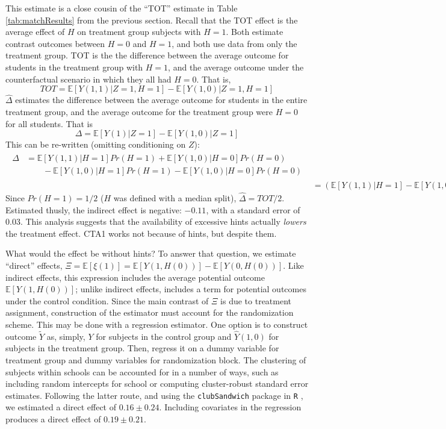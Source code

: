 \documentclass{article}
\newcommand{\EE}{\mathbb{E}}
\begin{document}
This estimate is a close cousin of the ``TOT'' estimate in Table
\ref{tab:matchResults} from the previous section.
Recall that the TOT effect is the average effect of $H$ on treatment
group subjects with $H=1$.
Both estimate contrast outcomes between $H=0$ and $H=1$, and both use
data from only the treatment group.
TOT is the the difference between the average outcome for students in
the treatment group with $H=1$, and the average outcome under the
counterfactual scenario in which they all had $H=0$.
That is,
\begin{equation*}
TOT=\EE[Y(1,1)|Z=1,H=1]-\EE[Y(1,0)|Z=1,H=1]
\end{equation*}
$\hat{\Delta}$ estimates the difference between the average outcome
for students in the entire treatment group, and the average outcome
for the treatment group were $H=0$ for all students.
That is
\begin{equation*}
\Delta=\EE[Y(1)|Z=1]-\EE[Y(1,0)|Z=1]
\end{equation*}
This can be re-written (omitting conditioning on $Z$):
\begin{align*}
\begin{split}
\Delta&=\EE[Y(1,1)|H=1]Pr(H=1)+\EE[Y(1,0)|H=0]Pr(H=0)\\
&\qquad -\EE[Y(1,0)|H=1]Pr(H=1)-\EE[Y(1,0)|H=0]Pr(H=0)
\end{split}
\\[2ex]
&=(\EE[Y(1,1)|H=1]-\EE[Y(1,0)|H=1])Pr(H=1)
\end{align*}
Since $Pr(H=1)=1/2$ ($H$ was defined with a median split),
$\hat{\Delta}=TOT/2$.
Estimated thusly, the indirect effect is negative: $-0.11$, with
a standard error of 0.03.
This analysis suggests that the availability of excessive hints
actually \emph{lowers} the treatment effect.
CTA1 works not because of hints, but despite them.

What would the effect be without hints?
To answer that question, we estimate ``direct'' effects,
$\Xi=\EE[\xi(1)]=\EE[Y(1,H(0))]-\EE[Y(0,H(0))]$.
Like indirect effects, this expression includes the average potential
outcome $\EE[Y(1,H(0))]$; unlike indirect effects, includes a term for
potential outcomes under the control condition.
Since the main contrast of $\Xi$ is due to treatment assignment,
construction of the estimator must account for the randomization
scheme.
This may be done with a regression estimator.
One option is to construct outcome $\tilde{Y}$ as, simply, $Y$ for
subjects in the control group and $\hat{Y}(1,0)$ for subjects in the
treatment group.
Then, regress it on a dummy variable for treatment group and dummy
variables for randomization block.
The clustering of subjects within schools can be accounted for in a
number of ways, such as including random intercepts for school or
computing cluster-robust standard error estimates.
Following the latter route, and using the \texttt{clubSandwich}
package in \texttt{R} \citep{clubsandwich}, we estimated a direct effect of $0.16\pm
0.24$.
Including covariates in the regression produces a direct effect of
$0.19\pm 0.21$.
\end{document}
